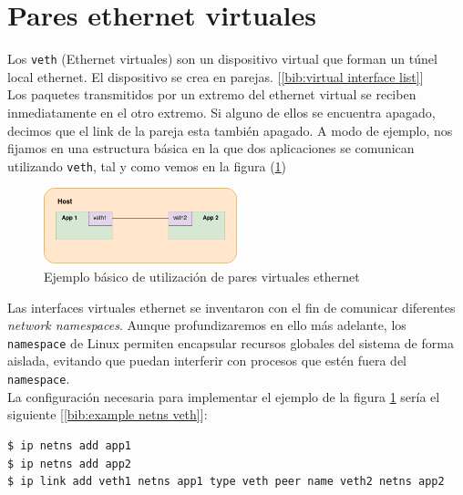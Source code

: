 \documentclass[a4paper, oneside, 12pt]{book}
\begin{document}
	\pagebreak
	
	\section{Pares ethernet virtuales}
	\label{sec: veth}
	\noindent Los \texttt{veth} (Ethernet virtuales) son un dispositivo virtual que forman un túnel local ethernet. El dispositivo se crea en parejas. [\ref{bib:virtual interface list}]\\
	
	\noindent Los paquetes transmitidos por un extremo del ethernet virtual se reciben inmediatamente en el otro extremo. Si alguno de ellos se encuentra apagado, decimos que el link de la pareja esta también apagado. A modo de ejemplo, nos fijamos en una estructura básica en la que dos aplicaciones se comunican utilizando \texttt{veth}, tal y como vemos en la figura (\ref{ej1 veth})\\
	
	\begin{figure}[h]
		\begin{center}
			\includegraphics[width=0.5\textwidth]{img/veth_ej1.png}
			\caption{Ejemplo básico de utilización de pares virtuales ethernet}
			\label{ej1 veth}
		\end{center}
	\end{figure}

	\noindent Las interfaces virtuales ethernet se inventaron con el fin de comunicar diferentes \textit{network namespaces}. Aunque profundizaremos en ello más adelante, los \texttt{namespace} de Linux permiten encapsular recursos globales del sistema de forma aislada, evitando que puedan interferir con procesos que estén fuera del \texttt{namespace}.\\
	
	\noindent La configuración necesaria para implementar el ejemplo de la figura \ref{ej1 veth} sería el siguiente [\ref{bib:example netns veth}]:
	
	\begin{verbatim}
$ ip netns add app1
$ ip netns add app2
$ ip link add veth1 netns app1 type veth peer name veth2 netns app2
	\end{verbatim}
	
\end{document}
